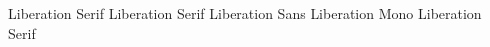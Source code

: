 \makeatletter
\makeatother

\usepackage{calc}

\usepackage{multicol}

\usepackage[table,xcdraw]{xcolor}

\usepackage{polyglossia}
\setdefaultlanguage{russian}

\usepackage{fontspec}
	\setmainfont%
		{Liberation Serif}
	\setromanfont%
		{Liberation Serif}
	\setsansfont%
		{Liberation Sans}
	\setmonofont%
		{Liberation Mono}
	\newfontfamily\cyrillicfont%
		{Liberation Serif}

\usepackage{graphicx}

\usepackage{geometry}
	\geometry{left   = 2   cm}
	\geometry{right  = 1.5 cm}
	\geometry{top    = 1   cm}
	\geometry{bottom = 2   cm}

\usepackage{datetime}

\usepackage{url}

%
%
